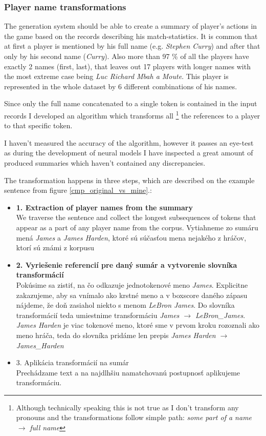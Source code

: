 \subsubsection{Player name transformations} \label{player_nm_trans_summary}

The generation system should be able to create a summary of player's actions in the game based on the records describing his match-statistics. It is common that at first a player is mentioned by his full name (e.g. \emph{Stephen Curry}) and after that only by his second name (\emph{Curry}). Also more than 97 \% of all the players have exactly 2 names (first, last), that leaves out 17 players with longer names with the most extreme case being \emph{Luc Richard Mbah a Moute}. This player is represented in the whole dataset by 6 different combinations of his names.

Since only the full name concatenated to a single token is contained in the input records I developed an algorithm which transforms all \footnote{Although technically speaking this is not true as I don't transform any pronouns and the transformations follow simple path: \emph{some part of a name} $\rightarrow$ \emph{full name}} the references to a player to that specific token.

I haven't measured the accuracy of the algorithm, however it passes an eye-test as during the development of neural models I have inspected a great amount of produced summaries which haven't contained any discrepancies.

The transformation happens in three steps, which are described on the example sentence from figure \ref{cmp_original_vs_mine}.:
\begin{itemize}
    \item \textbf{1. Extraction of player names from the summary} \hfill \\
    We traverse the sentence and collect the longest subsequences of tokens that appear as a part of any player name from the corpus. Vytiahneme zo sumáru mená \emph{James} a \emph{James Harden}, ktoré sú súčasťou mena nejakého z hráčov, ktorí sú známi z korpusu
    \item \textbf{2. Vyriešenie referencií pre daný sumár a vytvorenie slovníka transformácií} \hfill \\
    Pokúsime sa zistiť, na čo odkazuje jednotokenové meno \emph{James}. Explicitne zakazujeme, aby sa vnímalo ako krstné meno a v boxscore daného zápasu nájdeme, že doň zasiahol niekto s menom \emph{LeBron James}. Do slovníka transformácií teda umiestnime transformáciu \emph{James $\rightarrow$ LeBron\_James}. \emph{James Harden} je viac tokenové meno, ktoré sme v prvom kroku rozoznali ako meno hráča, teda do slovníka pridáme len prepis \emph{James Harden $\rightarrow$ James\_Harden}
    \item 3. Aplikácia transformácií na sumár \hfill \\
    Prechádzame text a na najdlhšiu namatchovanú postupnosť aplikujeme transformáciu.
\end{itemize}

